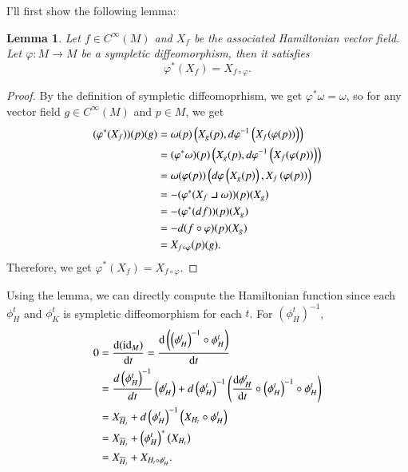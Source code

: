 \documentclass[a4paper, 12pt]{article}
\theoremstyle{Mydefinition}
\theoremstyle{Mytheorem}
\newtheorem{lemma}[statement]{Lemma}
\newcommand{\intprodl}{%
    \mathbin{\scalebox{1.5}{$\lrcorner$}}%
}
\begin{document}
I'll first show the following lemma:
\begin{lemma}
Let $f\in C^\infty(M)$ and $X_f$ be the associated Hamiltonian vector field. Let $\varphi:M\rightarrow M$ be a sympletic diffeomorphism, then it satisfies
\begin{equation*}
    \varphi^*(X_f) = X_{f\circ \varphi}.
\end{equation*}
\end{lemma}
\begin{proof}
By the definition of sympletic diffeomoprhism, we get $\varphi^*\omega = \omega$, so for any vector field $g\in C^\infty(M)$ and $p\in M$, we get
\begin{equation*}
\begin{split}
    (\varphi^*(X_f))(p)(g) &= \omega(p)\left(X_g(p), d\varphi^{-1}\left(X_f(\varphi(p))\right)\right)\\
    &= (\varphi^*\omega)(p)\left(X_g(p), d\varphi^{-1}\left(X_f(\varphi(p))\right)\right)\\
    &= \omega(\varphi(p))\left(d\varphi \left(X_g(p)\right),X_f\left(\varphi(p)\right)\right)\\
    &=-(\varphi^*(X_f\intprodl \omega))(p)(X_g)\\
    &=-(\varphi^*(df))(p)(X_g)\\
    &=-d(f\circ \varphi)(p)(X_g)\\
    &=X_{f\circ \varphi}(p)(g).
\end{split}
\end{equation*}
Therefore, we get $\varphi^*(X_f) = X_{f\circ \varphi}$.
\end{proof}

Using the lemma, we can directly compute the Hamiltonian function since each $\phi^t_H$ and $\phi^t_K$ is sympletic diffeomorphism for each $t$. For $(\phi_H^t)^{-1}$,
\begin{equation*}
\begin{split}
0 &= \dv{(\textrm{id}_M)}{t} = \dv{\left(\left(\phi^t_H\right)^{-1}\circ \phi^t_H\right)}{t}\\
&=\frac{d\left(\phi^t_H\right)^{-1}}{dt}\left(\phi^t_H\right) + d\left(\phi^t_H\right)^{-1}\left(\dv{\phi^t_H}{t}\circ \left(\phi^t_H\right)^{-1}\circ \phi^t_H\right)\\
&=X_{\overline{H}_t} + d\left(\phi^t_H\right)^{-1}\left(X_{H_t}\circ\phi^t_H\right)\\
&=X_{\overline{H}_t} + \left(\phi^t_H\right)^*\left(X_{H_t}\right)\\
&=X_{\overline{H}_t} + X_{H_t\circ \phi^t_H}.
\end{split}
\end{equation*}
\end{document}
